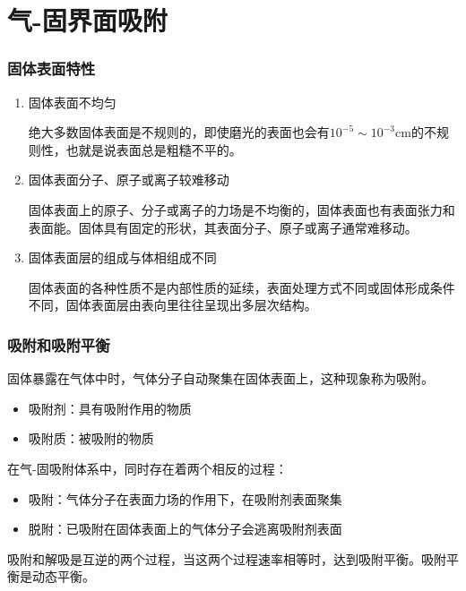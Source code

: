 \section{气-固界面吸附}


\begin{frame}
    \frametitle{固体表面特性}

    \begin{enumerate}
        \item 固体表面不均匀
        
        绝大多数固体表面是不规则的，即使磨光的表面也会有$10^{-5} \sim 10^{-3}$cm的不规则性，也就是说表面总是粗糙不平的。
        \item 固体表面分子、原子或离子较难移动
        
        固体表面上的原子、分子或离子的力场是不均衡的，固体表面也有表面张力和表面能。固体具有固定的形状，其表面分子、原子或离子通常难移动。
        \item 固体表面层的组成与体相组成不同
        
        固体表面的各种性质不是内部性质的延续，表面处理方式不同或固体形成条件不同，固体表面层由表向里往往呈现出多层次结构。
    \end{enumerate}

\end{frame}


\begin{frame}
    \frametitle{吸附和吸附平衡}

    固体暴露在气体中时，气体分子自动聚集在固体表面上，这种现象称为吸附。
    \begin{itemize}
        \item 吸附剂：具有吸附作用的物质
        \item 吸附质：被吸附的物质
    \end{itemize}

    在气-固吸附体系中，同时存在着两个相反的过程：
    \begin{itemize}
        \item 吸附：气体分子在表面力场的作用下，在吸附剂表面聚集
        \item 脱附：已吸附在固体表面上的气体分子会逃离吸附剂表面
    \end{itemize}
    吸附和解吸是互逆的两个过程，当这两个过程速率相等时，达到吸附平衡。吸附平衡是动态平衡。

\end{frame}


